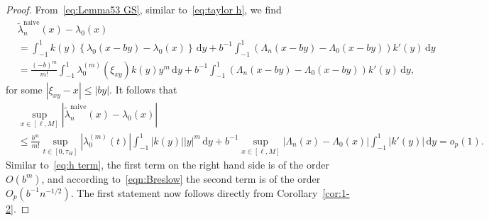 \documentclass[11pt,reqno]{amsart}
\theoremstyle{definition}
\theoremstyle{plain}
\theoremstyle{remark}
\begin{document}
\begin{proof}
From~\eqref{eq:Lemma53 GS}, similar to~\eqref{eq:taylor h},
we find
\[
\begin{split}
&
\tilde{\lambda}_n^{\mathrm{naive}}(x)-\lambda_0(x)\\
&=
\int_{-1}^1 k(y)
\left\{
\lambda_0(x-by)-\lambda_0(x)
\right\}\,\mathrm{d}y
+
b^{-1}
\int_{-1}^1
\left(\Lambda_n(x-by)-\Lambda_0(x-by)\right)
k'(y)\,\mathrm{d}y\\
&=
\frac{(-b)^m}{m!}
\int_{-1}^1
\lambda_0^{(m)}(\xi_{xy})k(y)y^m\,\mathrm{d}y
+
b^{-1}
\int_{-1}^1
\left(\Lambda_n(x-by)-\Lambda_0(x-by)\right)
k'(y)\,\mathrm{d}y,
\end{split}
\]
for some $|\xi_{xy}-x|\leq |by|$.
It follows that
\[
\begin{split}
&
\sup_{x\in[\ell,M]}
\left|
\tilde{\lambda}_n^{\mathrm{naive}}(x)-\lambda_0(x)
\right|\\
&\leq
\frac{b^m}{m!}
\sup_{t\in[0,\tau_H]}\left|\lambda_0^{(m)}(t)\right|
\int_{-1}^1
|k(y)||y|^m\,\mathrm{d}y
+
b^{-1}
\sup_{x\in[\ell,M]}
\left|
\Lambda_n(x)-\Lambda_0(x)
\right|
\int_{-1}^1
|k'(y)|\,\mathrm{d}y
=
o_p(1).
\end{split}
\]
Similar to~\eqref{eq:h term}, the first term on the right hand side is of the order $O(b^m)$,
and according to~\eqref{eqn:Breslow} the second term is of the order $O_p(b^{-1}n^{-1/2})$.
The first statement now follows directly from Corollary~\ref{cor:1-2}.


\end{proof}
\end{document}
